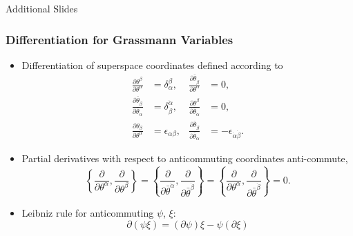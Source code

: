 \documentclass[10pt,aspectratio=169]{beamer}
\begin{document}
\appendix

\begin{frame}
  \begin{center}
    {
      \Large
      Additional Slides
    }
  \end{center}
\end{frame}


\begin{frame}
  \frametitle{Differentiation for Grassmann Variables}
  \begin{itemize} \itemsep1em
  \item Differentiation of superspace coordinates defined according to
  \begin{subequations}
    \begin{align*}
      \frac{\partial \theta^\beta}{\partial \theta^\alpha}&=\delta^\beta_\alpha,
      &
      \frac{\partial \bar{\theta}_{\dot{\beta}}}{\partial \theta^\alpha}&=0,\\
      \frac{\partial \bar{\theta}_{\dot{\beta}}}{\partial
        \bar{\theta}_{\dot{\alpha}}}
      &= \delta^{\dot{\alpha}}_{\dot{\beta}},
      &
      \frac{\partial \theta^\beta}{\partial \bar{\theta}_{\dot{\alpha}}} &=0, \\
      \frac{\partial \theta_\beta}{\partial \theta^\alpha}
      &=\epsilon_{\alpha\beta}, &
      \frac{\partial \bar{\theta}_{\dot{\beta}}}{\partial
        \bar{\theta}_{\dot{\alpha}}}&=-\epsilon_{\dot{\alpha}\dot{\beta}}.
    \end{align*}
  \end{subequations}
  \item Partial derivatives with respect to anticommuting coordinates
    anti-commute,
    \begin{equation*}
      \left \{ \frac{\partial }{\partial \theta^\alpha},
      \frac{\partial}{\partial \theta^\beta}\right \}=
      \left \{ \frac{\partial }{\partial \bar{\theta}^{\dot{\alpha}}},
      \frac{\partial}{\partial \bar{\theta}^{\dot{\beta}}}\right \}
      =\left \{ \frac{\partial }{\partial \theta^\alpha},
      \frac{\partial}{\partial \bar{\theta}^{\dot{\beta}}}\right \}=0.
    \end{equation*}
  \item Leibniz rule for anticommuting $\psi$, $\xi$:
    \begin{equation*}
      \partial(\psi \xi) = (\partial \psi) \xi - \psi (\partial \xi)
    \end{equation*}
  \end{itemize}
\end{frame}
\end{document}
